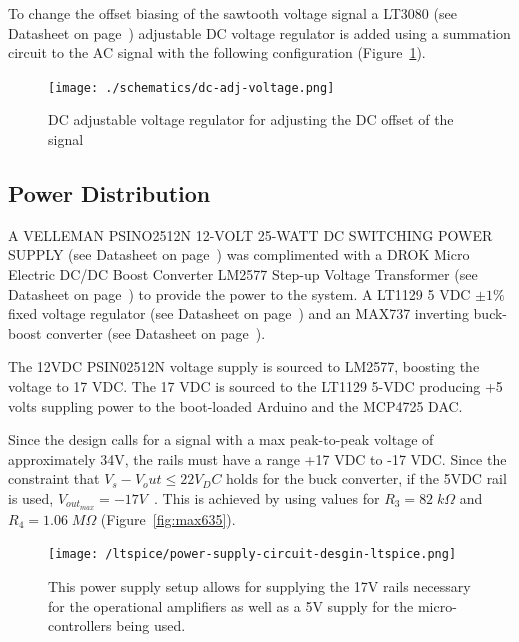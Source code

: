 \documentclass[12pt,journal]{IEEEtran}
\begin{document}
To change the offset biasing of the sawtooth voltage signal a LT3080 (see Datasheet on page~\pageref{datasheet:lt3080}) adjustable DC voltage regulator is added using a summation circuit to the AC signal with the following configuration (Figure~\ref{fig:dc-adj-voltage}).

\begin{figure}[h!]
  \centering
	\texttt{[image: ./schematics/dc-adj-voltage.png]}
	\caption{DC adjustable voltage regulator for adjusting the DC offset of the signal}
	\label{fig:dc-adj-voltage}
\end{figure}  


\subsection{Power Distribution}

A VELLEMAN PSINO2512N 12-VOLT 25-WATT DC SWITCHING POWER SUPPLY (see Datasheet on page~\pageref{datasheet:psin02512n}) was complimented with a DROK Micro Electric DC/DC Boost Converter LM2577 Step-up Voltage Transformer (see Datasheet on page~\pageref{datasheet:lm2577}) to provide the power to the system. A LT1129 5 VDC $\pm 1\%$ fixed voltage regulator (see Datasheet on page~\pageref{datasheet:lt1129}) and an MAX737 inverting buck-boost converter (see Datasheet on page~\pageref{datasheet:max635}). 

The 12VDC PSIN02512N voltage supply is sourced to LM2577, boosting the voltage to 17 VDC. The 17 VDC is sourced to the LT1129 5-VDC producing +5 volts suppling power to the boot-loaded Arduino and the MCP4725 DAC. 

Since the design calls for a signal with a max peak-to-peak voltage of approximately 34V, the rails must have a range +17 VDC to -17 VDC. Since the constraint that $V_s - V_out \leq 22 V_DC$ holds for the buck converter, if the 5VDC rail is used, $V_{out_{max}} = -17 V$~\cite{MAX635}. This is achieved by using values for $R_3 = 82\;k\Omega$ and $R_4 = 1.06\;M\Omega$ (Figure~\ref{fig:max635}). 

\begin{figure}[tb]
  \centering
	\texttt{[image: /ltspice/power-supply-circuit-desgin-ltspice.png]}
	\caption{This power supply setup allows for supplying the 17V rails necessary for the operational amplifiers as well as a 5V supply for the micro-controllers being used.}
	\label{fig:amplifier-configuration}
\end{figure}
\end{document}

